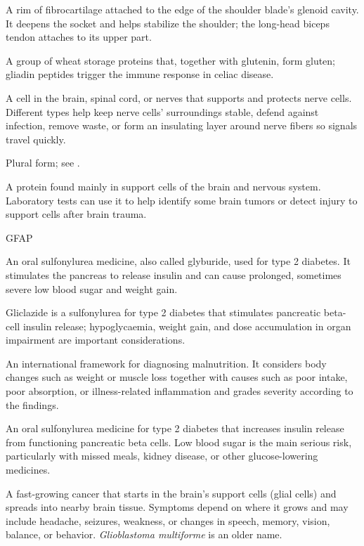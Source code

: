  A rim of fibrocartilage attached to the edge of the shoulder blade’s glenoid cavity. It deepens the socket and helps stabilize the shoulder; the long-head biceps tendon attaches to its upper part.

 A group of wheat storage proteins that, together with glutenin, form gluten; gliadin peptides trigger the immune response in celiac disease.

 A cell in the brain, spinal cord, or nerves that supports
and protects nerve cells. Different types help keep nerve cells' surroundings
stable, defend against infection, remove waste, or form an insulating layer
around nerve fibers so signals travel quickly.

 Plural form; see .

 A protein found mainly in support cells of the brain and nervous system. Laboratory tests can use it to help identify some brain tumors or detect injury to support cells after brain trauma.

\synonyms
GFAP

 An oral sulfonylurea medicine, also called glyburide, used for type 2 diabetes. It stimulates the pancreas to release insulin and can cause prolonged, sometimes severe low blood sugar and weight gain.

 Gliclazide is a sulfonylurea for type 2 diabetes that stimulates pancreatic beta-cell insulin release; hypoglycaemia, weight gain, and dose accumulation in organ impairment are important considerations.

 An international framework for diagnosing malnutrition. It considers body changes such as weight or muscle loss together with causes such as poor intake, poor absorption, or illness-related inflammation and grades severity according to the findings.

 An oral sulfonylurea medicine for type 2 diabetes that increases insulin release from functioning pancreatic beta cells. Low blood sugar is the main serious risk, particularly with missed meals, kidney disease, or other glucose-lowering medicines.

 A fast-growing cancer that starts in the brain's support cells (glial cells) and spreads into nearby brain tissue. Symptoms depend on where it grows and may include headache, seizures, weakness, or changes in speech, memory, vision, balance, or behavior. \textit{Glioblastoma multiforme} is an older name.

